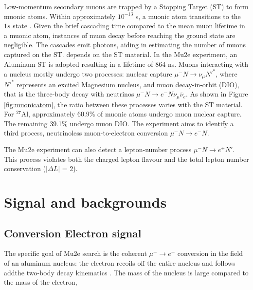 Low-momentum secondary muons are trapped by a Stopping Target (ST) to form muonic atoms. 
Within approximately $10^{-13}$ s, 
a muonic atom transitions to the $1s$ state \cite{MEASDAY2001243}. 
Given the brief cascading time compared to the mean muon lifetime in a muonic atom,  
instances of muon decay before reaching the ground state are negligible. 
The cascades emit photons, aiding in estimating the number of muons captured 
on the ST. 
 depends on the ST material.
In the Mu2e experiment, an Aluminum ST is adopted resulting in a lifetime of 
864 ns. Muons interacting with a nucleus mostly undergo two processes: 
nuclear capture $\mu^- N \rightarrow \nu_\mu N'^* $, where $N'^*$ represents an excited 
Magnesium nucleus, and muon decay-in-orbit (DIO), 
that is the three-body decay with neutrinos $\mu ^- N \rightarrow e^- N \nu_\mu \bar{\nu}_e$. 
As shown in Figure \ref{fig:muonicatom}, the ratio between these 
processes varies with the ST material. For $^{27}$Al, approximately 60.9\% 
of muonic atoms undergo muon nuclear capture. The remaining 39.1\% undergo muon DIO. 
The experiment aims to identify a third process, neutrinoless muon-to-electron 
conversion $\mu^- N \rightarrow e^- N $. 

The Mu2e experiment can also detect a lepton-number  process 
$\mu^- N \rightarrow e^+ N'$.
This process violates both the charged lepton flavour and the total lepton number 
conservation ($|\Delta L|$ = 2). 


\section{Signal and backgrounds}\label{sigandbkg}
\subsection{Conversion Electron signal}

The specific goal of Mu2e search is the  coherent $\mu^- \rightarrow e^-$
conversion in the field of an aluminum nucleus: the electron recoils off the 
entire nucleus and follows add{the} two-body decay kinematics \cite{bartoszek2015mu2e}. The mass of the nucleus is large compared to the 
mass of the electron, 


